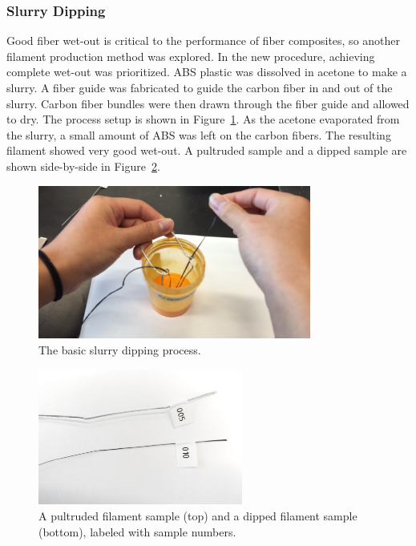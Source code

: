 \clearpage

\subsubsection{Slurry Dipping}

Good fiber wet-out is critical to the performance of fiber composites, so another filament production method was explored. In the new procedure, achieving complete wet-out was prioritized. ABS plastic was dissolved in acetone to make a slurry. A fiber guide was fabricated to guide the carbon fiber in and out of the slurry. Carbon fiber bundles were then drawn through the fiber guide and allowed to dry. The process setup is shown in Figure~\ref{fig:dipping-vid}. As the acetone evaporated from the slurry, a small amount of ABS was left on the carbon fibers. The resulting filament showed very good wet-out. A pultruded sample and a dipped sample are shown side-by-side in Figure~\ref{fig:two-samples}.\\

\begin{figure}[h!]
    \centering
    \includegraphics[width=0.8\textwidth]{./figures/dipping-vid}
    \caption{The basic slurry dipping process.}
    \label{fig:dipping-vid}
\end{figure}

\begin{figure}[h!]
    \centering
    \includegraphics[width=0.6\textwidth]{./figures/FilamentSample}
    \caption{A pultruded filament sample (top) and a dipped filament sample (bottom), labeled with sample numbers.}
    \label{fig:two-samples}
\end{figure}

